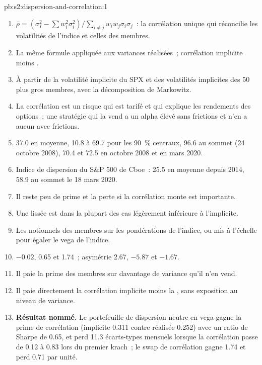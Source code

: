 \begin{solution}{pb:s2:dispersion-and-correlation:1}
\begin{enumerate}
\item $\bar\rho = (\sigma_I^2 - \sum w_i^2\sigma_i^2)/\sum_{i \ne j} w_i w_j\sigma_i\sigma_j$~: la corrélation unique qui réconcilie les
volatilités de l'indice et celles des membres.
\item La même formule appliquée aux variances réalisées~; corrélation implicite moins .
\item À partir de la volatilité implicite du SPX et des volatilités implicites des 50 plus gros membres, avec la décomposition de Markowitz.
\item La corrélation est un risque qui est tarifé et qui explique les rendements des options~; une stratégie qui la vend a un alpha élevé sans frictions et n'en a aucun avec frictions.
\item 37.0 en moyenne, 10.8 à 69.7 pour les 90~\% centraux, 96.6 au sommet (24 octobre 2008), 70.4 et 72.5 en octobre 2008 et en mars 2020.
\item Indice de dispersion du S\&P 500 de Cboe~: 25.5 en moyenne depuis 2014, 58.9 au sommet le 18 mars 2020.
\item Il reste peu de prime et la perte si la corrélation monte est importante.
\item Une  lissée est dans la plupart des cas légèrement inférieure à l'implicite.
\item Les notionnels des membres sur les pondérations de l'indice, ou mis à l'échelle pour égaler le vega de l'indice.
\item $-0.02$, 0.65 et 1.74~; asymétrie 2.67, $-5.87$ et $-1.67$.
\item Il paie la prime des membres sur davantage de variance qu'il n'en vend.
\item Il paie directement la corrélation implicite moins la , sans exposition au niveau de variance.
\item \textbf{Résultat nommé.} Le portefeuille de dispersion neutre en vega gagne la prime de corrélation (implicite 0.311 contre réalisée 0.252) avec un ratio de Sharpe de
0.65, et perd 11.3 écarts-types mensuels lorsque la corrélation passe de 0.12 à 0.83 lors du premier krach~; le swap de corrélation gagne 1.74 et perd
0.71 par unité.

\end{enumerate}
\end{solution}
